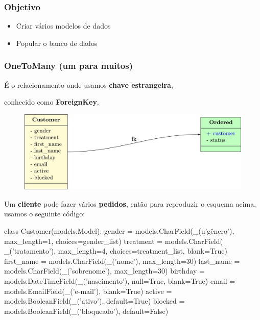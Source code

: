 \documentclass{beamer}
\begin{document}
{\begin{frame}
\end{frame}



\begin{frame}\frametitle{Objetivo}
	\begin{itemize}
		\item Criar vários modelos de dados
		\item Popular o banco de dados
	\end{itemize}
\end{frame}

\begin{frame}\frametitle{OneToMany (um para muitos)}
	

É o relacionamento onde usamos \textbf{chave estrangeira},

conhecido como \textbf{ForeignKey}.

	\begin{figure}[h]
	  \centering
  		\includegraphics[width=.8\paperwidth]{img/01fk.jpg}
	\end{figure}

Um \textbf{cliente} pode fazer vários \textbf{pedidos}, então para reproduzir o esquema acima, usamos o seguinte código:

\end{frame}

\begin{frame}[fragile]

\begin{pythoncode}
class Customer(models.Model):
    gender = models.CharField(_(u'gênero'), max_length=1, choices=gender_list)
    treatment = models.CharField(
        _('tratamento'), max_length=4, choices=treatment_list, blank=True)
    first_name = models.CharField(_('nome'), max_length=30)
    last_name = models.CharField(_('sobrenome'), max_length=30)
    birthday = models.DateTimeField(_('nascimento'), null=True, blank=True)
    email = models.EmailField(_('e-mail'), blank=True)
    active = models.BooleanField(_('ativo'), default=True)
    blocked = models.BooleanField(_('bloqueado'), default=False)



\end{pythoncode}
\end{frame}}
\end{document}
